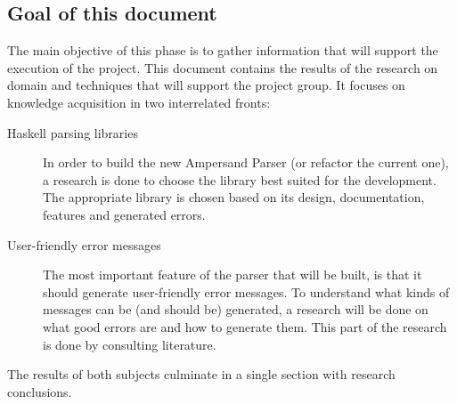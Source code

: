 
\subsection{Goal of this document}
The main objective of this phase is to gather information that will support the execution of the project.
This document contains the results of the research on domain and techniques that will support the project group.
It focuses on knowledge acquisition in two interrelated fronts:
\begin{description}
	\item[Haskell parsing libraries]
	In order to build the new Ampersand Parser (or refactor the current one), a research is done to choose the library best suited for the development.
	The appropriate library is chosen based on its design, documentation, features and generated errors.
	
	\item[User-friendly error messages]
	The most important feature of the parser that will be built, is that it should generate user-friendly error messages.
	To understand what kinds of messages can be (and should be) generated, a research will be done on what good errors are and how to generate them.
	This part of the research is done by consulting literature.
\end{description}
%
The results of both subjects culminate in a single section with research conclusions.
